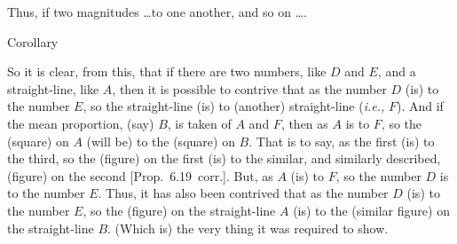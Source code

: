 \begin{Parallel}{}{}
{Thus,  if two magnitudes \ldots to one another, and so on \ldots.\\

\begin{center}
{\large Corollary}
\end{center}\vspace*{-7pt}

So it is clear, from this, that if there are two numbers, like $D$ and $E$, and
a straight-line, like $A$, then it is possible to contrive that as the number $D$ (is)
to the number $E$, so the straight-line (is) to (another) straight-line ({\em i.e.,} $F$). And if the mean proportion, (say) $B$,  is taken of $A$ and $F$, 
then as $A$ is to $F$, so the (square) on $A$ (will be) to the (square)
on $B$. That is to say, as the first (is) to the third, so the
(figure) on the first (is) to the similar, and similarly described, (figure) on the second [Prop.~6.19~corr.]. But, as $A$ (is) to
$F$, so the number $D$ is to the number $E$. Thus, it has also been contrived
that as the number $D$ (is) to the number $E$, so the (figure) on the
straight-line $A$ (is) to the (similar figure) on the straight-line $B$. (Which is)
the very thing it was required to show.}
\end{Parallel}


